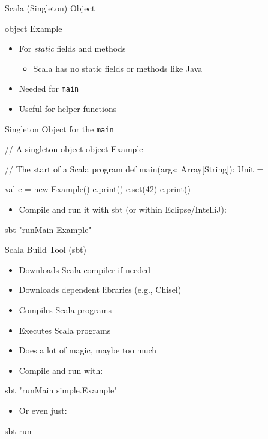 \documentclass[xcolor=pdflatex,dvipsnames,table]{beamer}
\newcommand{\code}[1]{{\texttt{#1}}}
\begin{document}
\begin{frame}[fragile]{Scala (Singleton) Object}
\begin{chisel}
object Example {}
\end{chisel}
\begin{itemize}
\item For \emph{static} fields and methods
\begin{itemize}
\item Scala has no static fields or methods like Java
\end{itemize}
\item Needed for \code{main}
\item Useful for helper functions
\end{itemize}
\end{frame}

\begin{frame}[fragile]{Singleton Object for the \code{main}}
\begin{chisel}
// A singleton object
object Example {
  
  // The start of a Scala program
  def main(args: Array[String]): Unit = {
    
    val e = new Example()
    e.print()
    e.set(42)
    e.print()
  }
}
\end{chisel}
\begin{itemize}
\item Compile and run it with sbt (or within Eclipse/IntelliJ):
\end{itemize}
\begin{chisel}
sbt "runMain Example"
\end{chisel}
\end{frame}

\begin{frame}[fragile]{Scala Build Tool (sbt)}
\begin{itemize}
\item Downloads Scala compiler if needed
\item Downloads dependent libraries (e.g., Chisel)
\item Compiles Scala programs
\item Executes Scala programs
\item Does a lot of magic, maybe too much
\item Compile and run with:
\end{itemize}
\begin{chisel}
sbt "runMain simple.Example"
\end{chisel}
\begin{itemize}
\item Or even just:
\end{itemize}
\begin{chisel}
sbt run
\end{chisel}
\end{frame}
\end{document}
